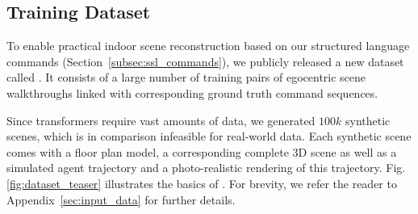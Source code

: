 \subsection{Training Dataset}
\label{section:data}

To enable practical indoor scene reconstruction
based on our structured language commands
(Section~\ref{subsec:ssl_commands}),
we publicly released a new dataset called \DatasetName.
It consists of a large number of training pairs
of egocentric scene walkthroughs
linked with corresponding ground truth command sequences.

Since transformers require vast amounts of data,
we generated $100k$ synthetic scenes,
which is in comparison infeasible for real-world data.
Each synthetic scene comes with a floor plan model, 
a corresponding complete 3D scene
 as well as a simulated agent trajectory and
a photo-realistic rendering of this trajectory.
Fig. \ref{fig:dataset_teaser} illustrates
the basics of \DatasetName{}.
For brevity, we refer the reader
to 
Appendix~\ref{sec:input_data}
for further details.
